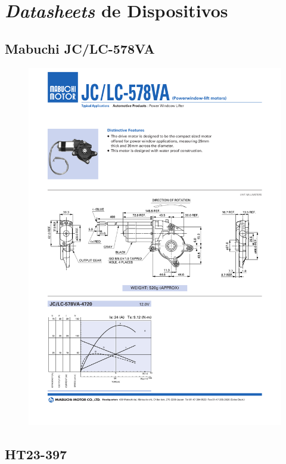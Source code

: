 \chapter{\textit{Datasheets} de Dispositivos}

\section{Mabuchi JC/LC-578VA}
\label{anexo-datasheets}


\label{Mabuchi}

\begin{figure}[h]   
\begin{centering}
\includegraphics[width=0.8\columnwidth]{datasheets/mabuchi.pdf}
\par\end{centering}

\end{figure}

\newpage
\section{HT23-397}

\label{HT23}

